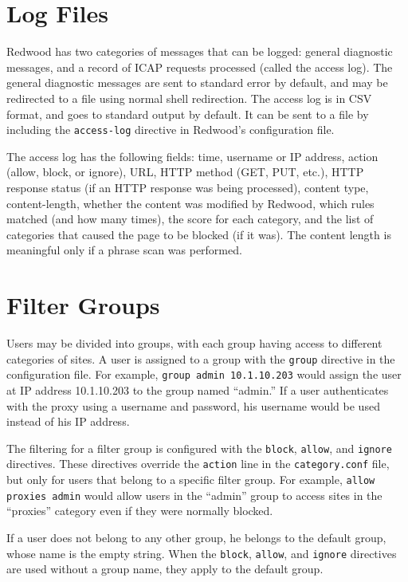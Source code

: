 \documentclass{article}
\begin{document}
\section{Log Files}

Redwood has two categories of messages that can be logged:
general diagnostic messages, and a record of ICAP requests processed (called the access log).
The general diagnostic messages are sent to standard error by default,
and may be redirected to a file using normal shell redirection.
The access log is in CSV format, 
and goes to standard output by default.
It can be sent to a file by including the \verb"access-log" directive in Redwood's configuration file.

The access log has the following fields: time, username or IP address, 
action (allow, block, or ignore), URL, HTTP method (GET, PUT, etc.),
HTTP response status (if an HTTP response was being processed), 
content type, content-length, whether the content was modified by Redwood, which rules matched (and how many times), 
the score for each category, and the list of categories that caused the page to be blocked (if it was).
The content length is meaningful only if a phrase scan was performed.

\section{Filter Groups}

Users may be divided into groups, with each group having access to different categories of sites.
A user is assigned to a group with the \verb"group" directive in the configuration file.
For example, \verb"group admin 10.1.10.203" would assign the user at IP address 10.1.10.203
to the group named ``admin.'' 
If a user authenticates with the proxy using a username and password, 
his username would be used instead of his IP address.

The filtering for a filter group is configured with the \verb"block", \verb"allow", and \verb"ignore"
directives. These directives override the \verb"action" line in the \verb"category.conf" file,
but only for users that belong to a specific filter group.
For example, \verb"allow proxies admin" would allow users in the ``admin'' group
to access sites in the ``proxies'' category even if they were normally blocked.

If a user does not belong to any other group, he belongs to the default group,
whose name is the empty string.
When the \verb"block", \verb"allow", and \verb"ignore" directives are used without a group name,
they apply to the default group.
\end{document}
